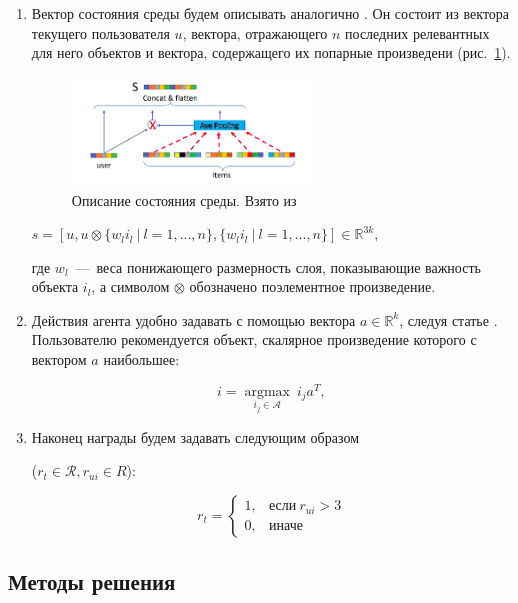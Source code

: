 \documentclass[14pt]{extarticle}
\DeclareMathOperator*{\argmax}{argmax}
\begin{document}
\begin{enumerate}

\item

Вектор состояния среды будем описывать аналогично \cite{Liu2018DeepRL}. Он состоит из вектора текущего пользователя $u$, вектора, отражающего $n$ последних релевантных для него объектов и вектора, содержащего их попарные произведени (рис.~\ref{fig:state}).

\begin{figure}[h]
	\centering
	\includegraphics[width=0.6\textwidth]{img/state_representation.png}
	\caption{Описание состояния среды. Взято из \cite{Liu2018DeepRL}}
	\label{fig:state}
\end{figure}

$s = \left[u, u \otimes \{w_l i_l\ |\ l = 1, ..., n\}, \{w_l i_l\ |\ l = 1,\dots, n\}\right] \in \mathbb{R}^{3k} ,$

где $w_l$~---~веса понижающего размерность слоя, показывающие важность объекта $i_l$, а символом $\otimes$ обозначено поэлементное произведение.

\item
Действия агента удобно задавать с помощью вектора $a\in \mathbb{R}^k$, следуя статье \cite{wolpertinger}. Пользователю рекомендуется объект, скалярное произведение которого с вектором $a$ наибольшее:

$$i = \underset{i_j\in \mathcal{A}}{\argmax}\ i_j a^T,$$

\item

Наконец награды будем задавать следующим образом 

($r_t\in \mathcal{R}, r_{ui} \in R$):

$$r_t= 
\begin{cases}
    1,& \text{если}\ r_{ui} > 3\\
    0,              & \text{иначе}
\end{cases}
$$
\end{enumerate}

\subsection{Методы решения}
\end{document}
